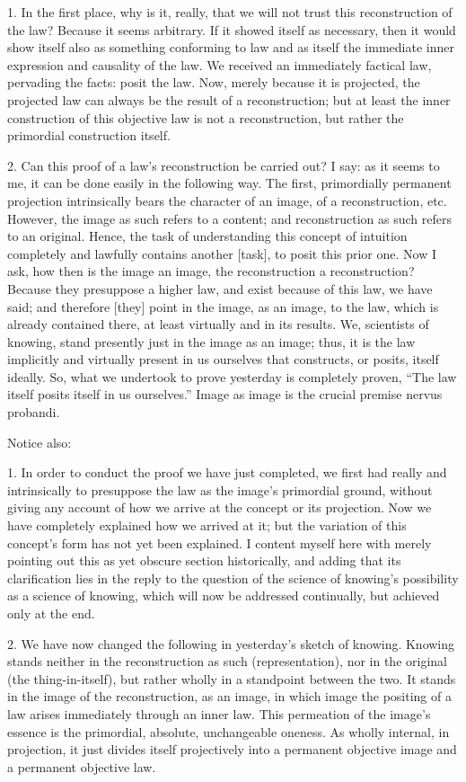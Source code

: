 1. In the first place, why is it, really,
that we will not trust this reconstruction of the law?
Because it seems arbitrary.
If it showed itself as necessary,
then it would show itself also as
something conforming to law
and as itself the immediate
inner expression and causality of the law.
We received an immediately factical law,
pervading the facts: posit the law.
Now, merely because it is projected,
the projected law can always be
the result of a reconstruction;
but at least the inner construction of
this objective law is not a reconstruction,
but rather the primordial construction itself.

2. Can this proof of a law's reconstruction be carried out?
I say: as it seems to me, it can be done easily in the following way.
The first, primordially permanent projection
intrinsically bears the character of an image,
of a reconstruction, etc.
However, the image as such refers to a content;
and reconstruction as such refers to an original.
Hence, the task of understanding this concept of intuition
completely and lawfully contains another [task],
to posit this prior one.
Now I ask, how then is the image an image,
the reconstruction a reconstruction?
Because they presuppose a higher law,
and exist because of this law, we have said;
and therefore [they] point in the image, as an image,
to the law, which is already contained there,
at least virtually and in its results.
We, scientists of knowing, stand presently
just in the image as an image;
thus, it is the law implicitly and virtually
present in us ourselves that constructs, or posits, itself ideally.
So, what we undertook to prove yesterday is completely proven,
“The law itself posits itself in us ourselves.”
Image as image is the crucial premise {nervus probandi}.

Notice also:

1. In order to conduct the proof we have just completed,
we first had really and intrinsically to presuppose
the law as the image's primordial ground,
without giving any account of how we arrive
at the concept or its projection.
Now we have completely explained how we arrived at it;
but the variation of this concept's form
has not yet been explained.
I content myself here with merely pointing out
this as yet obscure section historically,
and adding that its clarification lies
in the reply to the question of
the science of knowing's possibility
as a science of knowing,
which will now be addressed continually,
but achieved only at the end.

2. We have now changed the following
in yesterday's sketch of knowing.
Knowing stands neither in
the reconstruction as such (representation),
nor in the original (the thing-in-itself),
but rather wholly in a standpoint between the two.
It stands in the image of the reconstruction, as an image,
in which image the positing of a law arises
immediately through an inner law.
This permeation of the image's essence is
the primordial, absolute, unchangeable oneness.
As wholly internal, in projection,
it just divides itself projectively
into a permanent objective image
and a permanent objective law.

